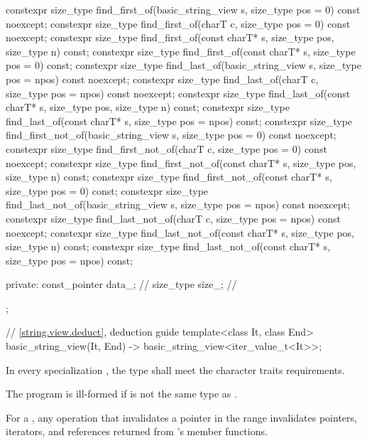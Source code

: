 \begin{codeblock}
{  constexpr size_type find_first_of(basic_string_view s, size_type pos = 0) const noexcept;
  constexpr size_type find_first_of(charT c, size_type pos = 0) const noexcept;
  constexpr size_type find_first_of(const charT* s, size_type pos, size_type n) const;
  constexpr size_type find_first_of(const charT* s, size_type pos = 0) const;
  constexpr size_type find_last_of(basic_string_view s, size_type pos = npos) const noexcept;
  constexpr size_type find_last_of(charT c, size_type pos = npos) const noexcept;
  constexpr size_type find_last_of(const charT* s, size_type pos, size_type n) const;
  constexpr size_type find_last_of(const charT* s, size_type pos = npos) const;
  constexpr size_type find_first_not_of(basic_string_view s, size_type pos = 0) const noexcept;
  constexpr size_type find_first_not_of(charT c, size_type pos = 0) const noexcept;
  constexpr size_type find_first_not_of(const charT* s, size_type pos,
                                        size_type n) const;
  constexpr size_type find_first_not_of(const charT* s, size_type pos = 0) const;
  constexpr size_type find_last_not_of(basic_string_view s,
                                       size_type pos = npos) const noexcept;
  constexpr size_type find_last_not_of(charT c, size_type pos = npos) const noexcept;
  constexpr size_type find_last_not_of(const charT* s, size_type pos,
                                       size_type n) const;
  constexpr size_type find_last_not_of(const charT* s, size_type pos = npos) const;

private:
  const_pointer data_;          // \expos
  size_type size_;              // \expos
};

// \ref{string.view.deduct}, deduction guide
template<class It, class End>
  basic_string_view(It, End) -> basic_string_view<iter_value_t<It>>;
\end{codeblock}

\pnum
In every specialization , the type  shall meet the character traits requirements.
\begin{note}
The program is ill-formed if  is not the same type as .
\end{note}

\pnum
For a ,
any operation that invalidates a pointer
in the range 
invalidates pointers, iterators, and references
returned from 's member functions.

